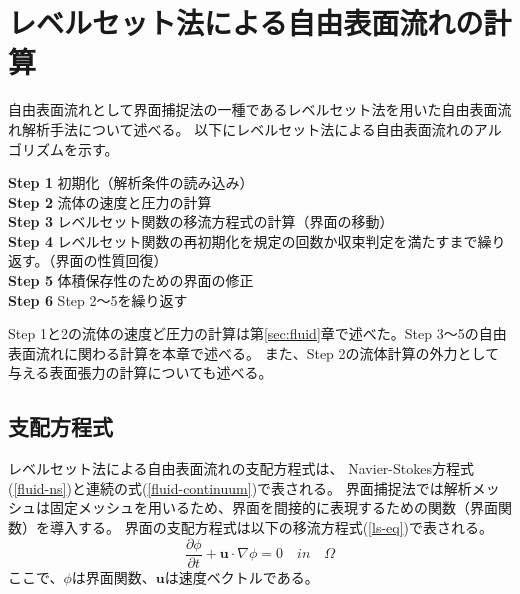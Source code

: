 \newpage
\section{レベルセット法による自由表面流れの計算}
自由表面流れとして界面捕捉法の一種であるレベルセット法を用いた自由表面流れ解析手法について述べる。
以下にレベルセット法による自由表面流れのアルゴリズムを示す。


\indent\textbf{Step 1} 初期化（解析条件の読み込み） \\
\indent\textbf{Step 2} 流体の速度と圧力の計算 \\
\indent\textbf{Step 3} レベルセット関数の移流方程式の計算（界面の移動） \\
\indent\textbf{Step 4} レベルセット関数の再初期化を規定の回数か収束判定を満たすまで繰り返す。（界面の性質回復）\\
\indent\textbf{Step 5} 体積保存性のための界面の修正 \\
\indent\textbf{Step 6} Step 2～5を繰り返す


Step 1と2の流体の速度ど圧力の計算は第\ref{sec:fluid}章で述べた。Step 3～5の自由表面流れに関わる計算を本章で述べる。
また、Step 2の流体計算の外力として与える表面張力の計算についても述べる。

\subsection{支配方程式}
レベルセット法による自由表面流れの支配方程式は、
Navier-Stokes方程式(\ref{fluid-ns})と連続の式(\ref{fluid-continuum})で表される。
界面捕捉法では解析メッシュは固定メッシュを用いるため、界面を間接的に表現するための関数（界面関数）を導入する。
界面の支配方程式は以下の移流方程式(\ref{ls-eq})で表される。
\begin{equation}
\label{ls-eq}
	\frac{\partial \phi}{\partial t} + \bm{u} \cdot \nabla \phi = 0 \quad in \quad \Omega
\end{equation}
ここで、$\phi$は界面関数、$\bm{u}$は速度ベクトルである。

